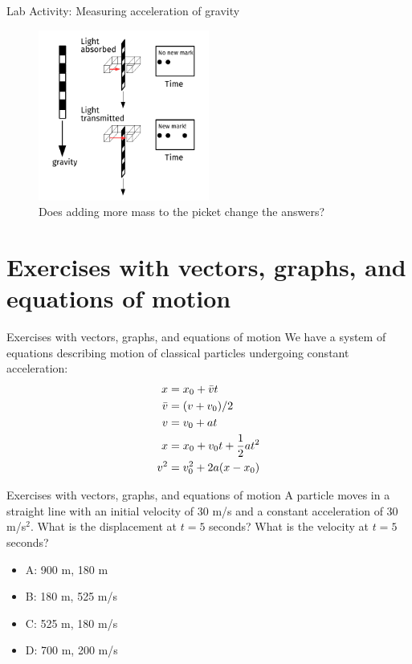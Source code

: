 \documentclass{beamer}
\begin{document}
\begin{frame}{Lab Activity: Measuring acceleration of gravity}
\small
\begin{figure}
\centering
\includegraphics[width=0.5\textwidth]{figures/PicketG.pdf}
\caption{\label{fig:picket3} Does adding more mass to the picket change the answers?}
\end{figure}
\end{frame}

\section{Exercises with vectors, graphs, and equations of motion}

\begin{frame}{Exercises with vectors, graphs, and equations of motion}
We have a system of equations describing motion of classical particles undergoing constant acceleration:
\begin{align}
x &= x_{\rm 0} +\bar{v}t \\
\bar{v} &= (v+v_{\rm 0})/2 \\
v &= v_{\rm 0} + at \\
x &= x_{\rm 0} + v_{\rm 0} t + 	\frac{1}{2}at^2 \\
v^2 &= v_{\rm 0}^2 + 2a(x-x_{\rm 0})
\end{align}
\end{frame}

\begin{frame}{Exercises with vectors, graphs, and equations of motion}
A particle moves in a straight line with an initial velocity of 30 m/s and a constant acceleration of 30 m/s$^2$.  What is the displacement at $t=5$ seconds?  What is the velocity at $t=5$ seconds? \\
\begin{itemize}
\item A: 900 m, 180 m
\item B: 180 m, 525 m/s
\item C: 525 m, 180 m/s
\item D: 700 m, 200 m/s
\end{itemize}
\end{frame}
\end{document}
